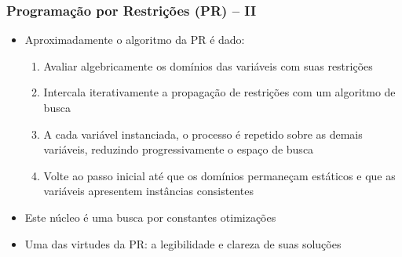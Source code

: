 \begin{frame}[fragile]

    \frametitle{Programação por Restrições (PR) -- II}

   \begin{block}{}
     \begin{itemize}

      \item Aproximadamente o algoritmo da PR é dado:
       \pause       
          \begin{enumerate}

            \item Avaliar algebricamente  os domínios das variáveis com suas restrições

            \item Intercala iterativamente a \textsf{propagação de restrições} com 
                  um \textsf{algoritmo de busca}

            \item A cada variável instanciada, o processo é repetido sobre as demais variáveis, reduzindo progressivamente o espaço de busca

            \item Volte ao passo inicial até que os domínios permaneçam estáticos
            e que as variáveis apresentem instâncias consistentes
              
          \end{enumerate}
       
        \pause
       \item Este núcleo é uma busca por constantes otimizações

        \pause
       \item Uma das virtudes da PR: a legibilidade e clareza de suas soluções
       
    \end{itemize}
    
    \end{block}
    
\end{frame}



